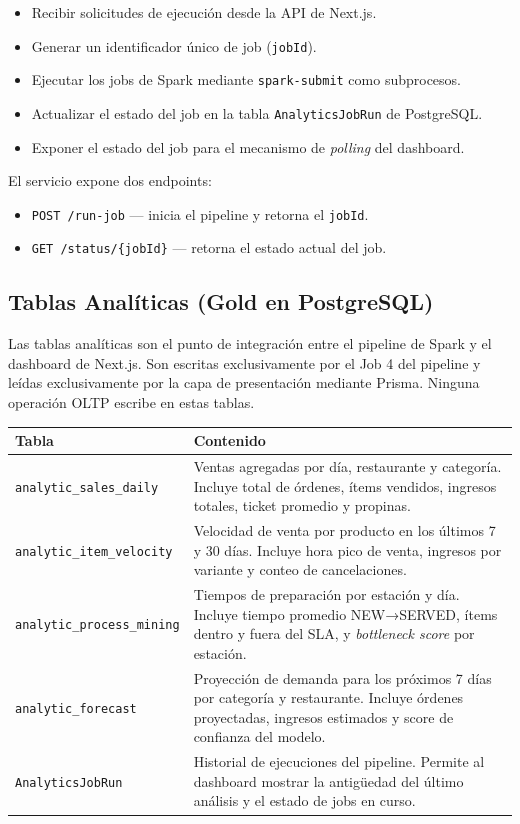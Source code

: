 \documentclass[12pt, letterpaper]{article}
\begin{document}
\begin{itemize}
  \item Recibir solicitudes de ejecución desde la API de Next.js.
  \item Generar un identificador único de job (\texttt{jobId}).
  \item Ejecutar los jobs de Spark mediante \texttt{spark-submit} como subprocesos.
  \item Actualizar el estado del job en la tabla \texttt{AnalyticsJobRun} de PostgreSQL.
  \item Exponer el estado del job para el mecanismo de \textit{polling} del dashboard.
\end{itemize}

El servicio expone dos endpoints:

\begin{itemize}
  \item \texttt{POST /run-job} — inicia el pipeline y retorna el \texttt{jobId}.
  \item \texttt{GET /status/\{jobId\}} — retorna el estado actual del job.
\end{itemize}

\subsection{Tablas Analíticas (Gold en PostgreSQL)}

Las tablas analíticas son el punto de integración entre el pipeline de Spark y el dashboard de Next.js. Son escritas exclusivamente por el Job 4 del pipeline y leídas exclusivamente por la capa de presentación mediante Prisma. Ninguna operación OLTP escribe en estas tablas.

\begin{longtable}{|p{5.2cm}|p{8.3cm}|}
\hline
\textbf{Tabla} & \textbf{Contenido} \\
\hline
\texttt{analytic\_sales\_daily} & Ventas agregadas por día, restaurante y categoría. Incluye total de órdenes, ítems vendidos, ingresos totales, ticket promedio y propinas. \\
\hline
\texttt{analytic\_item\_velocity} & Velocidad de venta por producto en los últimos 7 y 30 días. Incluye hora pico de venta, ingresos por variante y conteo de cancelaciones. \\
\hline
\texttt{analytic\_process\_mining} & Tiempos de preparación por estación y día. Incluye tiempo promedio NEW→SERVED, ítems dentro y fuera del SLA, y \textit{bottleneck score} por estación. \\
\hline
\texttt{analytic\_forecast} & Proyección de demanda para los próximos 7 días por categoría y restaurante. Incluye órdenes proyectadas, ingresos estimados y score de confianza del modelo. \\
\hline
\texttt{AnalyticsJobRun} & Historial de ejecuciones del pipeline. Permite al dashboard mostrar la antigüedad del último análisis y el estado de jobs en curso. \\
\hline
\end{longtable}
\end{document}
